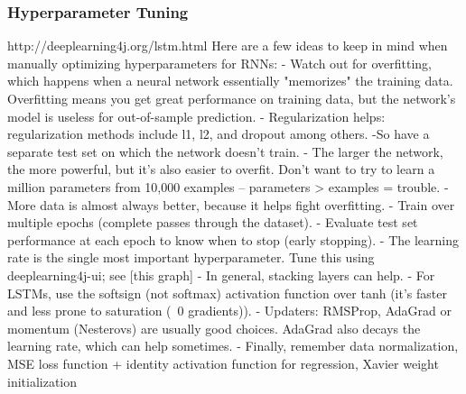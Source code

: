 {\subsubsection{Hyperparameter Tuning}
http://deeplearning4j.org/lstm.html
Here are a few ideas to keep in mind when manually optimizing hyperparameters for RNNs:
   - Watch out for overfitting, which happens when a neural network essentially "memorizes" the training data. Overfitting means you get great performance on training data, but the network’s model is useless for out-of-sample prediction.
   - Regularization helps: regularization methods include l1, l2, and dropout among others.
    -So have a separate test set on which the network doesn’t train.
   - The larger the network, the more powerful, but it’s also easier to overfit. Don’t want to try to learn a million parameters from 10,000 examples – parameters > examples = trouble.
  -  More data is almost always better, because it helps fight overfitting.
  -  Train over multiple epochs (complete passes through the dataset).
   - Evaluate test set performance at each epoch to know when to stop (early stopping).
  -  The learning rate is the single most important hyperparameter. Tune this using deeplearning4j-ui; see [this graph] %
  -  In general, stacking layers can help.
  -  For LSTMs, use the softsign (not softmax) activation function over tanh (it’s faster and less prone to saturation (~0 gradients)).
  -  Updaters: RMSProp, AdaGrad or momentum (Nesterovs) are usually good choices. AdaGrad also decays the learning rate, which can help sometimes.
   - Finally, remember data normalization, MSE loss function + identity activation function for regression, Xavier weight initialization


} %